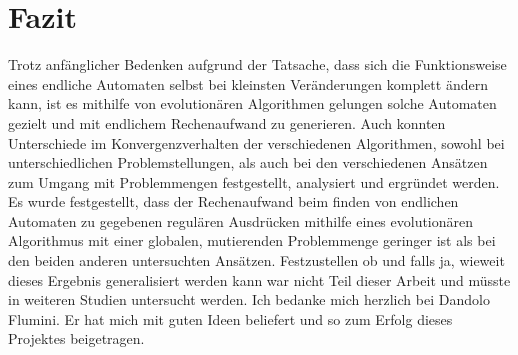 \clearpage
\section{Fazit}
Trotz anfänglicher Bedenken aufgrund der Tatsache, dass sich die Funktionsweise eines endliche Automaten selbst bei kleinsten Veränderungen komplett ändern kann, ist es mithilfe von evolutionären Algorithmen gelungen solche Automaten gezielt und mit endlichem Rechenaufwand zu generieren. Auch konnten Unterschiede im Konvergenzverhalten der verschiedenen Algorithmen, sowohl bei unterschiedlichen Problemstellungen, als auch bei den verschiedenen Ansätzen zum Umgang mit Problemmengen festgestellt, analysiert und ergründet werden. Es wurde festgestellt, dass der Rechenaufwand beim finden von endlichen Automaten zu gegebenen regulären Ausdrücken mithilfe eines evolutionären Algorithmus mit einer globalen, mutierenden Problemmenge geringer ist als bei den beiden anderen untersuchten Ansätzen. Festzustellen ob und falls ja, wieweit dieses Ergebnis generalisiert werden kann war nicht Teil dieser Arbeit und müsste in weiteren Studien untersucht werden. Ich bedanke mich herzlich bei Dandolo Flumini. Er hat mich mit guten Ideen beliefert und so zum Erfolg dieses Projektes beigetragen.
